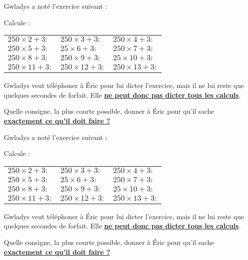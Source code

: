 \documentclass[a4paper,12pt,landscape,twocolumn]{article}
\begin{document}
\newcommand{\contenu}{
	\maketitle

	Gwladys a noté l’exercice suivant :

	\begin{greybox}
		Calcule : \vspace{0.5em}

		\setlength{\tabcolsep}{15pt}
		\begin{tabular}{lll}
			$250 × 2 + 3 : $  & $250 × 3 + 3 : $  & $250 × 4 + 3 : $  \\
			$250 × 5 + 3 : $  & $25 × 6 + 3 : $   & $250 × 7 + 3 : $  \\
			$250 × 8 + 3 : $  & $250 × 9 + 3 : $  & $25 × 10 + 3 : $  \\
			$250 × 11 + 3 : $ & $250 × 12 + 3 : $ & $250 × 13 + 3 : $
		\end{tabular}
	\end{greybox}

	Gwladys veut téléphoner à Éric pour lui dicter l’exercice, mais il ne lui reste que quelques secondes de forfait. Elle \textbf{\uline{ne peut donc pas dicter tous les calculs}}. \vspace{1em}

	Quelle consigne, la plus courte possible, donner à Éric pour qu’il sache \textbf{\uline{exactement ce qu’il doit faire ?}}
}

\contenu
\newpage
\contenu
\end{document}
